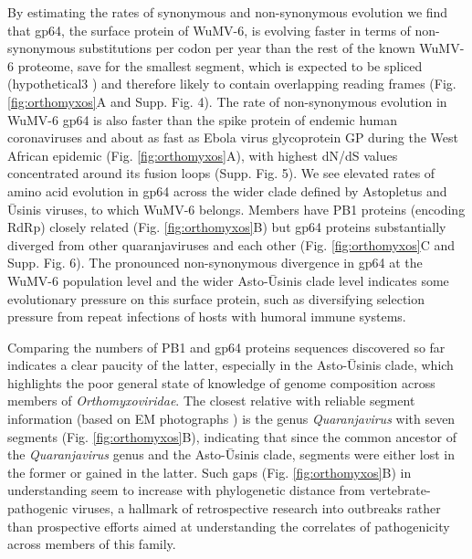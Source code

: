 \documentclass[11pt,twocolumn]{article}
\begin{document}
By estimating the rates of synonymous and non-synonymous evolution we find that gp64, the surface protein of WuMV-6, is evolving faster in terms of non-synonymous substitutions per codon per year than the rest of the known WuMV-6 proteome, save for the smallest segment, which is expected to be spliced (hypothetical3 \citep{batson_single_2021}) and therefore likely to contain overlapping reading frames (Fig. \ref{fig:orthomyxos}A and Supp. Fig. 4).
The rate of non-synonymous evolution in WuMV-6 gp64 is also faster than the spike protein of endemic human coronaviruses \citep{kistler_evidence_2021} and about as fast as Ebola virus glycoprotein GP during the West African epidemic \citep{park_ebola_2015}(Fig. \ref{fig:orthomyxos}A), with highest dN/dS values concentrated around its fusion loops \citep{garry_proteomics_2008} (Supp. Fig. 5).
We see elevated rates of amino acid evolution in gp64 across the wider clade defined by Astopletus and \={U}sinis viruses, to which WuMV-6 belongs. Members have PB1 proteins (encoding RdRp) closely related (Fig. \ref{fig:orthomyxos}B) but gp64 proteins substantially diverged from other quaranjaviruses and each other (Fig. \ref{fig:orthomyxos}C and Supp. Fig. 6).
The pronounced non-synonymous divergence in gp64 at the WuMV-6 population level and the wider Asto-\={U}sinis clade level indicates some evolutionary pressure on this surface protein, such as diversifying selection pressure from repeat infections of hosts with humoral immune systems.


Comparing the numbers of PB1 and gp64 proteins sequences discovered so far indicates a clear paucity of the latter, especially in the Asto-\={U}sinis clade, which highlights the poor general state of knowledge of genome composition across members of \textit{Orthomyxoviridae}.
The closest relative with reliable segment information (based on EM photographs \citep{allison_cyclic_2015}) is the genus \textit{Quaranjavirus} with seven segments (Fig. \ref{fig:orthomyxos}B), indicating that since the common ancestor of the \textit{Quaranjavirus} genus and the Asto-\={U}sinis clade, segments were either lost in the former or gained in the latter.
Such gaps (Fig. \ref{fig:orthomyxos}B) in understanding seem to increase with phylogenetic distance from vertebrate-pathogenic viruses, a hallmark of retrospective research into outbreaks rather than prospective efforts aimed at understanding the correlates of pathogenicity across members of this family.
\end{document}

